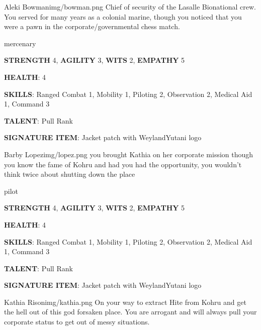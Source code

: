 
\begin{rpg-pcbox}{Aleki Bowman}{img/bowman.png}
    Chief of security of the Lasalle Bionational crew. You served for many years as a colonial marine, though you noticed that you were a pawn in the corporate/governmental chess match.
\end{rpg-pcbox}

\begin{rpg-commentbox}{}
    mercenary

    \textbf{STRENGTH} 4, \textbf{AGILITY} 3, \textbf{WITS} 2, \textbf{EMPATHY} 5

    \textbf{HEALTH}: 4

    \textbf{SKILLS}: Ranged Combat 1, Mobility 1, Piloting 2, Observation 2, Medical Aid 1, Command 3
    
    \textbf{TALENT}: Pull Rank
    
    \textbf{SIGNATURE ITEM}: Jacket patch with WeylandYutani logo    
\end{rpg-commentbox}

\newsect

\begin{rpg-pcbox}{Barby Lopez}{img/lopez.png}
    you brought Kathia on her corporate mission though you know the fame of Kohru and had you had the opportunity, you wouldn't think twice about shutting down the place
\end{rpg-pcbox}

\begin{rpg-commentbox}{}
    pilot

    \textbf{STRENGTH} 4, \textbf{AGILITY} 3, \textbf{WITS} 2, \textbf{EMPATHY} 5

    \textbf{HEALTH}: 4

    \textbf{SKILLS}: Ranged Combat 1, Mobility 1, Piloting 2, Observation 2, Medical Aid 1, Command 3
    
    \textbf{TALENT}: Pull Rank
    
    \textbf{SIGNATURE ITEM}: Jacket patch with WeylandYutani logo    
\end{rpg-commentbox}


\newsect

\medskip \medskip \medskip \medskip


\begin{rpg-pcbox}{Kathia Rison}{img/kathia.png}
    On your way to extract Hite from Kohru and get the hell out of this god forsaken place.
    You are arrogant and will always pull your corporate status to get out of messy situations.
\end{rpg-pcbox}


